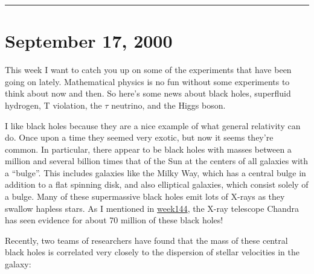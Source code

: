 \documentclass{article}
\renewcommand{\texttt}[1]{%
  \begingroup
  \ttfamily
  \begingroup\lccode`~=`/\lowercase{\endgroup\def~}{/\discretionary{}{}{}}%
  \begingroup\lccode`~=`[\lowercase{\endgroup\def~}{[\discretionary{}{}{}}%
  \begingroup\lccode`~=`.\lowercase{\endgroup\def~}{.\discretionary{}{}{}}%
  \catcode`/=\active\catcode`[=\active\catcode`.=\active
  \scantokens{#1\noexpand}%
  \endgroup
}
\begin{document}
\begin{center}\rule{0.5\linewidth}{0.5pt}\end{center}



\hypertarget{week156}{%
\section{September 17, 2000}\label{week156}}

This week I want to catch you up on some of the experiments that have
been going on lately. Mathematical physics is no fun without some
experiments to think about now and then. So here's some news about black
holes, superfluid hydrogen, T violation, the \(\tau\) neutrino, and the
Higgs boson.

I like black holes because they are a nice example of what general
relativity can do. Once upon a time they seemed very exotic, but now it
seems they're common. In particular, there appear to be black holes with
masses between a million and several billion times that of the Sun at
the centers of all galaxies with a ``bulge''. This includes galaxies
like the Milky Way, which has a central bulge in addition to a flat
spinning disk, and also elliptical galaxies, which consist solely of a
bulge. Many of these supermassive black holes emit lots of X-rays as
they swallow hapless stars. As I mentioned in
\href{week144.html}{week144}, the X-ray telescope Chandra has seen
evidence for about 70 million of these black holes!

Recently, two teams of researchers have found that the mass of these
central black holes is correlated very closely to the dispersion of
stellar velocities in the galaxy:

\end{document}
